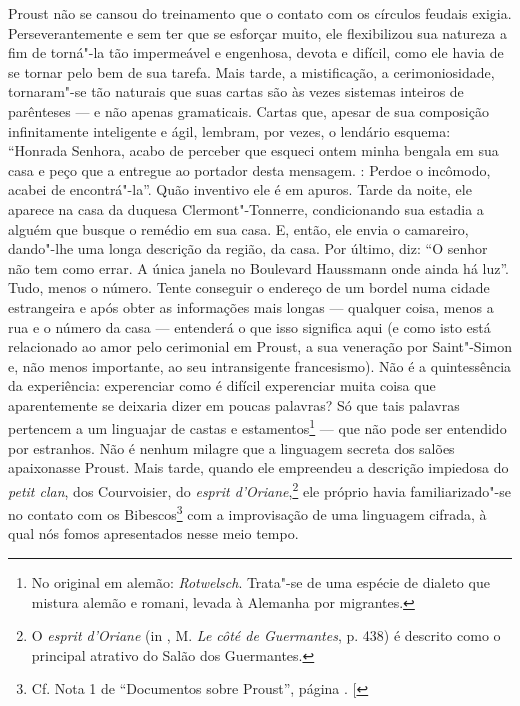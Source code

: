 Proust não se cansou do treinamento que o contato com os círculos
feudais exigia. Perseverantemente e sem ter que se esforçar muito, ele
flexibilizou sua natureza a fim de torná"-la tão impermeável e engenhosa,
devota e difícil, como ele havia de se tornar pelo bem de sua tarefa.
Mais tarde, a mistificação, a cerimoniosidade, tornaram"-se tão
naturais que suas cartas são às vezes sistemas inteiros de parênteses ---
e não apenas gramaticais. Cartas que, apesar de sua composição
infinitamente inteligente e ágil, lembram, por vezes, o lendário
esquema: ``Honrada Senhora, acabo de perceber que esqueci ontem minha
bengala em sua casa e peço que a entregue ao portador desta mensagem.
: Perdoe o incômodo, acabei de encontrá"-la''. Quão inventivo ele é
em apuros. Tarde da noite, ele aparece na casa da duquesa
Clermont"-Tonnerre, condicionando sua estadia a alguém que busque o
remédio em sua casa. E, então, ele envia o camareiro, dando"-lhe uma
longa descrição da região, da casa. Por último, diz: ``O senhor não tem
como errar. A única janela no Boulevard Haussmann onde ainda há luz''.
Tudo, menos o número. Tente conseguir o endereço de um bordel numa
cidade estrangeira e após obter as informações mais longas --- qualquer
coisa, menos a rua e o número da casa --- entenderá o que isso significa
aqui (e como isto está relacionado ao amor pelo cerimonial em Proust, a
sua veneração por Saint"-Simon e, não menos importante, ao seu
intransigente francesismo). Não é a quintessência da experiência:
experenciar como é difícil experenciar muita coisa que aparentemente
se deixaria dizer em poucas palavras? Só que tais palavras pertencem a
um linguajar de castas e estamentos\footnote{No original em alemão:
  \emph{Rotwelsch}. Trata"-se de uma espécie de dialeto que mistura
  alemão e romani, levada à Alemanha por migrantes. \versal{[N.~T.]}} --- que não pode ser
entendido por estranhos. Não é nenhum milagre que a linguagem secreta
dos salões apaixonasse Proust. Mais tarde, quando ele empreendeu a
descrição impiedosa do \emph{petit clan}, dos Courvoisier, do
\emph{esprit d'Oriane},\footnote{O \emph{esprit d'Oriane} (in ,
  M. \emph{Le côté de Guermantes}, p. 438) é descrito como o principal
  atrativo do Salão dos Guermantes. \versal{[N.~O.]}} ele próprio havia familiarizado"-se
no contato com os Bibescos\footnote{Cf. Nota 1 de ``Documentos sobre Proust'', página \pageref{bibescos}. {[}\versal{N.~O.}{]}} com a improvisação de uma linguagem cifrada,
à qual nós fomos apresentados nesse meio tempo.

